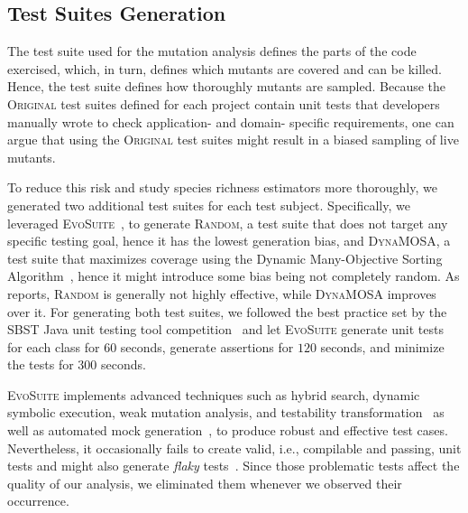 \documentclass[sigconf,review,anonymous]{acmart}
\newcommand{\Evosuite}{\textsc{EvoSuite}\xspace}
\newcommand{\original}{\textsc{Original}\xspace}
\newcommand{\EvosuiteRandom}{\textsc{Random}\xspace}
\newcommand{\EvosuiteDynamosa}{\textsc{DynaMOSA}\xspace}
\begin{document}
\subsection{Test Suites Generation}
\label{sec:testgeneration}
The test suite used for the mutation analysis defines
the parts of the code exercised, which, in turn, 
defines which mutants are covered and can be killed.
%
Hence, the test suite defines how thoroughly mutants are sampled.
%
Because the \original test suites defined for each project contain unit tests
that developers manually wrote to check application- and
domain- specific requirements, one can argue that using
the \original test suites %
might result in a biased sampling of live mutants.

To reduce this risk and study species richness estimators more thoroughly, we generated two
additional test suites for each test subject.
%
Specifically, we leveraged \Evosuite~\cite{fraser2011evosuite}, 
to generate \EvosuiteRandom, a test suite that does not target any specific testing goal, hence it has the lowest generation bias, 
and \EvosuiteDynamosa, a test suite that maximizes coverage using the Dynamic Many-Objective Sorting Algorithm~\cite{panichella2015reformulating},
hence it might introduce some bias being not completely random.
As  reports, \EvosuiteRandom is generally not highly effective,
while \EvosuiteDynamosa improves over it.
%
For generating both test suites, we followed the best practice set by the 
SBST Java unit testing tool competition~\cite{devroey2020java,panichella2021sbst,DBLP:conf/sbst/GambiJRZ22}
and let \Evosuite generate unit tests for each class for $60$ seconds,
generate assertions for $120$ seconds, and minimize the tests for $300$ seconds.

\Evosuite implements advanced techniques 
such as hybrid search, dynamic symbolic execution, weak mutation analysis, and testability transformation~\cite{fraser2013whole} as well as 
automated mock generation~\cite{arcuri2015generating},
to produce robust and effective test cases.
%
Nevertheless, it occasionally fails to create valid, i.e., compilable and passing,
unit tests %
and might also generate \emph{flaky} tests~\cite{DBLP:conf/icse/Fan19}.
%
Since those problematic tests affect the quality of our analysis,
 we eliminated them whenever we observed their occurrence.
\end{document}
